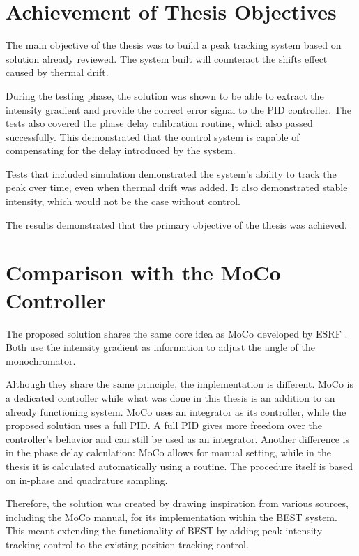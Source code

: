 \section{Achievement of Thesis Objectives}

The main objective of the thesis was to build a peak tracking system based on solution already reviewed.
The system built will counteract the shifts effect caused by thermal drift.

During the testing phase, the solution was shown to be able to extract the intensity gradient and provide the correct error signal to the PID controller. 
The tests also covered the phase delay calibration routine, which also passed successfully. This demonstrated that the control system is capable of compensating for the delay introduced by the system.

Tests that included simulation demonstrated the system's ability to track the peak over time, even when thermal drift was added. It also demonstrated stable intensity, which would not be the case without control.

The results demonstrated that the primary objective of the thesis was achieved.

\section{Comparison with the MoCo Controller}

The proposed solution shares the same core idea as MoCo developed by ESRF \cite{MoCo2008}.
Both use the intensity gradient as information to adjust the angle of the monochromator.


Although they share the same principle, the implementation is different.
MoCo is a dedicated controller while what was done in this thesis is an addition to an already functioning system.
MoCo uses an integrator as its controller, while the proposed solution uses a full PID.
A full PID gives more freedom over the controller's behavior and can still be used as an integrator.
Another difference is in the phase delay calculation: MoCo allows for manual setting, while in the thesis it is calculated automatically using a routine. The procedure itself is based on in-phase and quadrature sampling.

Therefore, the solution was created by drawing inspiration from various sources, including the MoCo manual, for its implementation within the BEST system.
This meant extending the functionality of BEST by adding peak intensity tracking control to the existing position tracking control.

